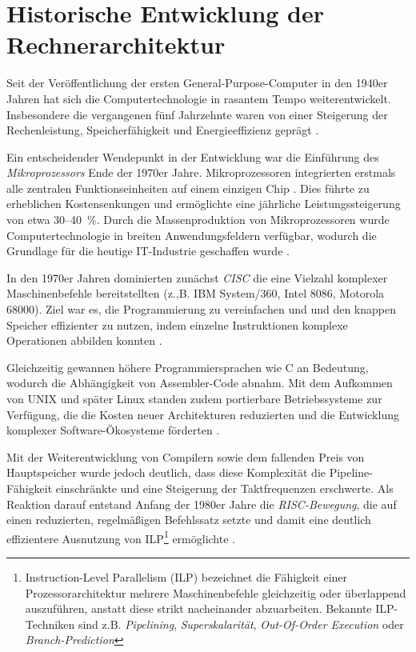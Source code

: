 \section{Historische Entwicklung der Rechnerarchitektur}

Seit der Veröffentlichung der ersten General-Purpose-Computer in den 1940er Jahren hat sich die Computertechnologie in rasantem Tempo weiterentwickelt. Insbesondere die vergangenen fünf Jahrzehnte waren von einer Steigerung der Rechenleistung, Speicherfähigkeit und Energieeffizienz geprägt \parencite[S.~2]{hennessy_computer_2011}.


Ein entscheidender Wendepunkt in der Entwicklung war die Einführung des \textit{Mikroprozessors} Ende der 1970er Jahre. Mikroprozessoren integrierten erstmals alle zentralen Funktionseinheiten auf einem einzigen Chip \parencite[S.~9]{dumas_ii_computer_2006}. Dies führte zu erheblichen Kostensenkungen und ermöglichte eine jährliche Leistungssteigerung von etwa 30–40~\%. Durch die Massenproduktion von Mikroprozessoren wurde Computertechnologie in breiten Anwendungsfeldern verfügbar, wodurch die Grundlage für die heutige IT-Industrie geschaffen wurde \parencites[S.~2]{hennessy_computer_2011}[S.~11]{dumas_ii_computer_2006}.

In den 1970er Jahren dominierten zunächst \textit{\ac{CISC}} die eine Vielzahl komplexer Maschinenbefehle bereitstellten (z.,B. IBM System/360, Intel 8086, Motorola 68000). Ziel war es, die Programmierung zu vereinfachen und und den knappen Speicher effizienter zu nutzen, indem einzelne Instruktionen komplexe Operationen abbilden konnten \parencite[S.~12]{dumas_ii_computer_2006}.

Gleichzeitig gewannen höhere Programmiersprachen wie C an Bedeutung, wodurch die Abhängigkeit von Assembler-Code abnahm. Mit dem Aufkommen von UNIX und später Linux standen zudem portierbare Betriebssysteme zur Verfügung, die die Kosten neuer Architekturen reduzierten und die Entwicklung komplexer Software-Ökosysteme förderten \parencites[S.~2]{hennessy_computer_2011}[S.~12]{dumas_ii_computer_2006}.


Mit der Weiterentwicklung von Compilern sowie dem fallenden Preis von Hauptspeicher wurde jedoch deutlich, dass diese Komplexität die Pipeline-Fähigkeit einschränkte und eine Steigerung der Taktfrequenzen erschwerte. Als Reaktion darauf entstand Anfang der 1980er Jahre die \textit{\ac{RISC}-Bewegung}, die auf einen reduzierten, regelmäßigen Befehlssatz setzte und damit eine deutlich effizientere Ausnutzung von \ac{ILP}\footnote{Instruction-Level Parallelism (ILP) bezeichnet die Fähigkeit einer Prozessorarchitektur mehrere Maschinenbefehle gleichzeitig oder überlappend auszuführen, anstatt diese strikt nacheinander abzuarbeiten. Bekannte ILP-Techniken sind z.B. \textit{Pipelining}, \textit{Superskalarität}, \textit{Out-Of-Order Execution} oder \textit{Branch-Prediction}} ermöglichte \parencite[S.~2]{hennessy_computer_2011}.  

